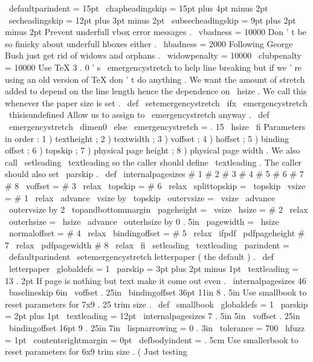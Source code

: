 {\
defaultparindent
=
15pt
\
chapheadingskip
=
15pt
plus
4pt
minus
2pt
\
secheadingskip
=
12pt
plus
3pt
minus
2pt
\
subsecheadingskip
=
9pt
plus
2pt
minus
2pt
%
Prevent
underfull
vbox
error
messages
.
\
vbadness
=
10000
%
Don
'
t
be
so
finicky
about
underfull
hboxes
either
.
\
hbadness
=
2000
%
Following
George
Bush
just
get
rid
of
widows
and
orphans
.
\
widowpenalty
=
10000
\
clubpenalty
=
10000
%
Use
TeX
3
.
0
'
s
\
emergencystretch
to
help
line
breaking
but
if
we
'
re
%
using
an
old
version
of
TeX
don
'
t
do
anything
.
We
want
the
amount
of
%
stretch
added
to
depend
on
the
line
length
hence
the
dependence
on
%
\
hsize
.
We
call
this
whenever
the
paper
size
is
set
.
%
\
def
\
setemergencystretch
{
%
\
ifx
\
emergencystretch
\
thisisundefined
%
Allow
us
to
assign
to
\
emergencystretch
anyway
.
\
def
\
emergencystretch
{
\
dimen0
}
%
\
else
\
emergencystretch
=
.
15
\
hsize
\
fi
}
%
Parameters
in
order
:
1
)
textheight
;
2
)
textwidth
;
%
3
)
voffset
;
4
)
hoffset
;
5
)
binding
offset
;
6
)
topskip
;
%
7
)
physical
page
height
;
8
)
physical
page
width
.
%
%
We
also
call
\
setleading
{
\
textleading
}
so
the
caller
should
define
%
\
textleading
.
The
caller
should
also
set
\
parskip
.
%
\
def
\
internalpagesizes
#
1
#
2
#
3
#
4
#
5
#
6
#
7
#
8
{
%
\
voffset
=
#
3
\
relax
\
topskip
=
#
6
\
relax
\
splittopskip
=
\
topskip
%
\
vsize
=
#
1
\
relax
\
advance
\
vsize
by
\
topskip
\
outervsize
=
\
vsize
\
advance
\
outervsize
by
2
\
topandbottommargin
\
pageheight
=
\
vsize
%
\
hsize
=
#
2
\
relax
\
outerhsize
=
\
hsize
\
advance
\
outerhsize
by
0
.
5in
\
pagewidth
=
\
hsize
%
\
normaloffset
=
#
4
\
relax
\
bindingoffset
=
#
5
\
relax
%
\
ifpdf
\
pdfpageheight
#
7
\
relax
\
pdfpagewidth
#
8
\
relax
\
fi
%
\
setleading
{
\
textleading
}
%
\
parindent
=
\
defaultparindent
\
setemergencystretch
}
%
letterpaper
(
the
default
)
.
\
def
\
letterpaper
{
{
\
globaldefs
=
1
\
parskip
=
3pt
plus
2pt
minus
1pt
\
textleading
=
13
.
2pt
%
%
If
page
is
nothing
but
text
make
it
come
out
even
.
\
internalpagesizes
{
46
\
baselineskip
}
{
6in
}
%
{
\
voffset
}
{
.
25in
}
%
{
\
bindingoffset
}
{
36pt
}
%
{
11in
}
{
8
.
5in
}
%
}
}
%
Use
smallbook
to
reset
parameters
for
7x9
.
25
trim
size
.
\
def
\
smallbook
{
{
\
globaldefs
=
1
\
parskip
=
2pt
plus
1pt
\
textleading
=
12pt
%
\
internalpagesizes
{
7
.
5in
}
{
5in
}
%
{
\
voffset
}
{
.
25in
}
%
{
\
bindingoffset
}
{
16pt
}
%
{
9
.
25in
}
{
7in
}
%
%
\
lispnarrowing
=
0
.
3in
\
tolerance
=
700
\
hfuzz
=
1pt
\
contentsrightmargin
=
0pt
\
defbodyindent
=
.
5cm
}
}
%
Use
smallerbook
to
reset
parameters
for
6x9
trim
size
.
%
(
Just
testing
}
